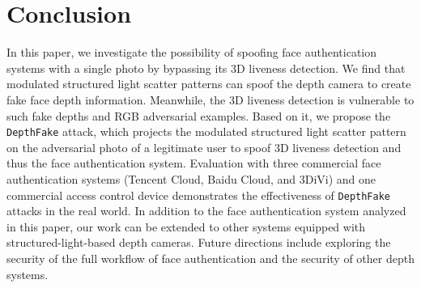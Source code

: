 \section{Conclusion}

In this paper, we investigate the possibility of spoofing  face authentication systems with a single  photo by bypassing its 3D liveness detection. 
We find that modulated structured light scatter patterns can spoof the depth camera to create fake face depth information. Meanwhile, the 3D liveness detection is vulnerable to such fake depths and RGB adversarial examples. 
Based on it, we propose the \texttt{DepthFake} attack, which projects the modulated structured light scatter pattern on the adversarial photo of a legitimate user to spoof 3D liveness detection and thus the face authentication system.
Evaluation with three commercial face authentication systems (Tencent Cloud, Baidu Cloud, and 3DiVi) and one commercial access control device demonstrates the effectiveness of \texttt{DepthFake}  attacks in the real world. In addition to the face authentication system analyzed in this paper, our work can be extended to other systems equipped with structured-light-based depth cameras. Future directions include exploring the security of the full workflow of face authentication and the security of other depth systems.